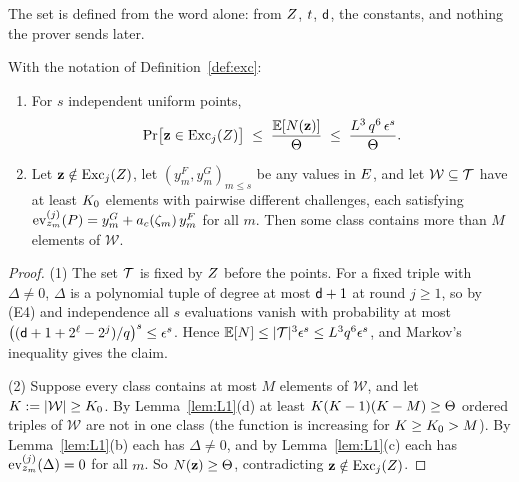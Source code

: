 The set is defined from the word alone: from $Z$, $t$, $\mathsf{d}$, the constants, and nothing the prover sends later.

\begin{theorem}[Counting]\label{thm:count}
With the notation of Definition~\ref{def:exc}:
\begin{enumerate}[itemsep=1pt,topsep=2pt,label=\textnormal{(\arabic*)}]
\item For $s$ independent uniform points,
\[
\Pr\bigl[\mathbf z\in\operatorname{Exc}_j(Z)\bigr]\;\le\;\frac{\mathbb{E}[N(\mathbf z)]}{\Theta}\;\le\;\frac{L^3\,q^6\,\epsilon^{s}}{\Theta}.
\]
\item Let $\mathbf z\notin\operatorname{Exc}_j(Z)$, let $(y^F_m,y^G_m)_{m\le s}$ be any values in $E$, and let $\mathcal W\subseteq\mathcal{T}$ have at least $K_0$ elements with pairwise different challenges, each satisfying $\operatorname{ev}^{(j)}_{z_m}(P)=y^G_m+a_c(\zeta_m)\,y^F_m$ for all $m$. Then some class contains more than $M$ elements of $\mathcal W$.
\end{enumerate}
\end{theorem}
\begin{proof}
(1) The set $\mathcal{T}$ is fixed by $Z$ before the points. For a fixed triple with $\Delta\ne0$, $\Delta$ is a polynomial tuple of degree at most $\mathsf{d}+1$ at round $j\ge1$, so by (E4) and independence all $s$ evaluations vanish with probability at most $\bigl((\mathsf{d}+1+2^\ell-2^j)/q\bigr)^s\le\epsilon^s$. Hence $\mathbb{E}[N]\le|\mathcal{T}|^3\epsilon^s\le L^3q^6\epsilon^s$, and Markov's inequality gives the claim.

(2) Suppose every class contains at most $M$ elements of $\mathcal W$, and let $K:=|\mathcal W|\ge K_0$. By Lemma~\ref{lem:L1}(d) at least $K(K-1)(K-M)\ge\Theta$ ordered triples of $\mathcal W$ are not in one class (the function is increasing for $K\ge K_0>M$). By Lemma~\ref{lem:L1}(b) each has $\Delta\ne0$, and by Lemma~\ref{lem:L1}(c) each has $\operatorname{ev}^{(j)}_{z_m}(\Delta)=0$ for all $m$. So $N(\mathbf z)\ge\Theta$, contradicting $\mathbf z\notin\operatorname{Exc}_j(Z)$.
\end{proof}

